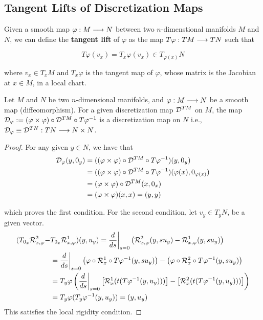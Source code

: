 \subsection{Tangent Lifts of Discretization Maps}

Given a smooth map $\varphi: M \longrightarrow N$ between two $n$-dimenstional manifolds $M$ and $N$, we can define the \textbf{tangent lift} of $\varphi$ as the map $T\varphi: TM \longrightarrow TN$ such that

\[
  T\varphi(v_x) = T_x \varphi(v_x) \in T_{\varphi(x)} N
\]

where $v_x \in T_x M$ and $T_x\varphi$ is the tangent map of $\varphi$, whose matrix is the Jacobian at $x \in M$, in a local chart.

\begin{prop}
Let $M$ and $N$ be two $n$-dimensional manifolds, and $\varphi: M \longrightarrow N$ be a smooth map (diffeomorphism). For a given discretization map $\mathcal{D}^{TM}$ on $M$, the map $\mathcal{D}_{\varphi} :=  (\varphi \times \varphi) \circ \mathcal{D}^{TM} \circ T \varphi ^{-1}$ is a discretization map on $N$ i.e., $\mathcal{D}_{\varphi} \equiv \mathcal{D}^{TN} : TN \longrightarrow N \times N$.
\end{prop}


\begin{proof}
  For any given $y \in N$, we have that 
  \begin{equation*}
    \begin{split}
      \mathcal{D}_{\varphi} (y, 0_y) &= ((\varphi \times \varphi) \circ \mathcal{D}^{TM} \circ T\varphi^{-1}) (y, 0_y) \\
      &= ((\varphi \times \varphi) \circ \mathcal{D}^{TM} \circ T\varphi^{-1}) (\varphi(x), 0_{\varphi(x)}) \\
      &= (\varphi \times \varphi) \circ \mathcal{D}^{TM} (x, 0_x) \\ 
      &= (\varphi \times \varphi) (x, x) = (y, y)
    \end{split}
  \end{equation*}

  which proves the first condition. For the second condition, let $v_y \in T_y N$, be a given vector.
  \begin{equation*}
    \begin{split}
      (T_{0_x} \mathcal{R}_{x, \varphi}^2 - & T_{0_x} \mathcal{R}_{x, \varphi}^1 )(y, u_y) = \dfrac{d}{ds} \bigg{|}_{s=0} \left( \mathcal{R}_{x, \varphi}^2 (y, su_y) - \mathcal{R}_{x, \varphi}^1 (y, su_y) \right) \\
      &= \dfrac{d}{ds} \bigg{|}_{s=0} \left(\varphi \circ \mathcal{R}^1_x \circ T\varphi^{-1} (y, su_y) \right) -  \left( \varphi \circ \mathcal{R}^2_x \circ T \varphi^{-1}(y, su_y) \right) \\
      &= T_y \varphi \left( \dfrac{d}{ds} \bigg{|}_{s=0} \left[ \mathcal{R}^1_x(t(T\varphi^{-1} (y, u_y))) \right] - \left[ \mathcal{R}^2_x(t(T\varphi^{-1} (y, u_y))) \right] \right) \\
      &= T_y \varphi (T_y \varphi^{-1} (y, u_y)) = (y, u_y)
    \end{split}
  \end{equation*}
This satisfies the local rigidity condition.
\end{proof}

